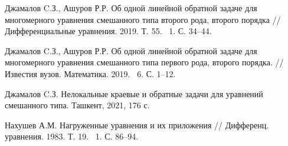 \begin{thebibliography}{9} %

 Джамалов C.З., Ашуров Р.Р. Об одной линейной обратной задаче для многомерного уравнения смешанного типа второго рода, второго порядка // Дифференциальные уравнения.  2019. Т. 55. \textnumero ~1. С. 34--44.

 Джамалов C.З., Ашуров Р.Р. Об одной линейной обратной задаче для многомерного уравнения смешанного типа первого рода, второго порядка. // Известия вузов. Математика. 2019. \textnumero ~6. С. 1--12.

 Джамалов C.З. Нелокальные краевые и обратные задачи для уравнений смешанного типа. Ташкент, 2021, 176 с.

 Нахушев А.М. Нагруженные уравнения и их приложения // Дифференц. уравнения. 1983.  Т. 19. \textnumero ~1. С. 86--94.





\end{thebibliography}




%
